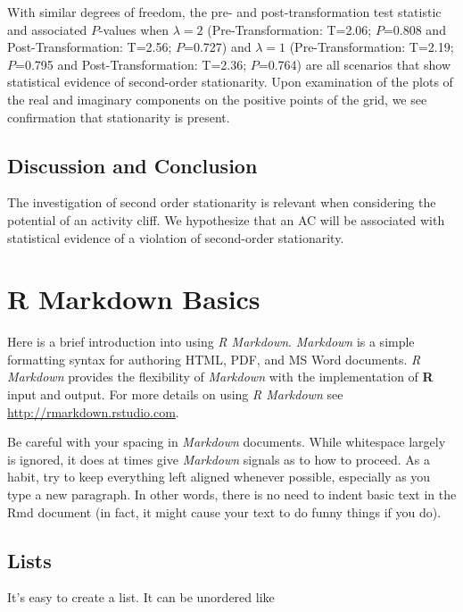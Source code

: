 \documentclass[print]{nuthesis}
\begin{document}
With similar degrees of freedom, the pre- and post-transformation test statistic and associated \(P\)-values when \(\lambda=2\) (Pre-Transformation: T=2.06; \(P\)=0.808 and Post-Transformation: T=2.56; \(P\)=0.727) and \(\lambda=1\) (Pre-Transformation: T=2.19; \(P\)=0.795 and Post-Transformation: T=2.36; \(P\)=0.764) are all scenarios that show statistical evidence of second-order stationarity. Upon examination of the plots of the real and imaginary components on the positive points of the grid, we see confirmation that stationarity is present.

\hypertarget{discussion-and-conclusion}{%
\section{Discussion and Conclusion}\label{discussion-and-conclusion}}

The investigation of second order stationarity is relevant when considering the potential of an activity cliff. We hypothesize that an AC will be associated with statistical evidence of a violation of second-order stationarity.

\hypertarget{rmd-basics}{%
\chapter{R Markdown Basics}\label{rmd-basics}}

Here is a brief introduction into using \emph{R Markdown}. \emph{Markdown} is a simple formatting syntax for authoring HTML, PDF, and MS Word documents. \emph{R Markdown} provides the flexibility of \emph{Markdown} with the implementation of \textbf{R} input and output. For more details on using \emph{R Markdown} see \url{http://rmarkdown.rstudio.com}.

Be careful with your spacing in \emph{Markdown} documents. While whitespace largely is ignored, it does at times give \emph{Markdown} signals as to how to proceed. As a habit, try to keep everything left aligned whenever possible, especially as you type a new paragraph. In other words, there is no need to indent basic text in the Rmd document (in fact, it might cause your text to do funny things if you do).

\hypertarget{lists}{%
\section{Lists}\label{lists}}

It's easy to create a list. It can be unordered like
\end{document}
